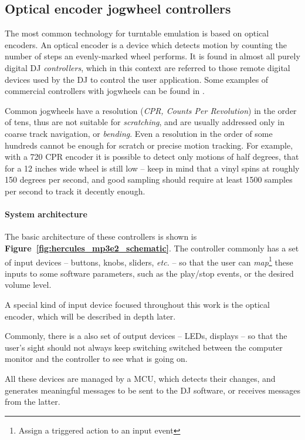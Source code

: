 \documentclass[a4paper,10pt]{article}
\begin{document}
\begin{multicols}{2}
\subsection{Optical encoder jogwheel controllers}

The most common technology for turntable emulation is based on optical encoders.
An optical encoder is a device which detects motion by counting the number of
steps an evenly-marked wheel performs. It is found in almost all purely digital
DJ \emph{controllers}, which in this context are referred to those remote
digital devices used by the DJ to control the user application. Some examples
of commercial controllers with jogwheels can be found in \cite{eks_op}
\cite{pioneer_ddjs1} \cite{vestax_vci400}.

Common jogwheels have a resolution (\emph{CPR, Counts Per Revolution}) in the
order of tens, thus are not suitable for \emph{scratching}, and are usually
addressed only in coarse track navigation, or \emph{bending}.
Even a resolution in the order of some hundreds cannot be enough for scratch
or precise motion tracking. For example, with a 720 CPR encoder it is possible
to detect only motions of half degrees, that for a 12 inches wide wheel is
still low -- keep in mind that a vinyl spins at roughly 150 degrees per second,
and good sampling should require at least 1500 samples per second to track it
decently enough.


\paragraph{System architecture}
The basic architecture of these controllers is shown is \textbf{Figure~\ref{fig:hercules_mp3e2_schematic}}.
The controller commonly has a set of input devices -- buttons, knobs,
sliders, \textit{etc.} -- so that the user can \emph{map}\footnote{
	Assign a triggered action to an input event
} these inputs to some software parameters, such as the play/stop events, or
the desired volume level.

A special kind of input device focused throughout this work is the optical
encoder, \TODO which will be described in depth later.

Commonly, there is a also set of output devices -- LEDs, displays -- so that
the user's sight should not always keep switching switched between the computer
monitor and the controller to see what is going on.

All these devices are managed by a MCU, which detects their changes, and
generates meaningful messages to be sent to the DJ software, or receives
messages from the latter.


\end{multicols}
\end{document}
